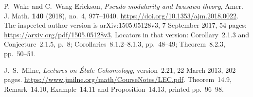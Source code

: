 P.~Wake and C.~Wang-Erickson,
\emph{Pseudo-modularity and Iwasawa theory},
Amer. J. Math. \textbf{140} (2018), no.~4, 977--1040.
\url{https://doi.org/10.1353/ajm.2018.0022}.
The inspected author version is arXiv:1505.05128v3,
7 September 2017, 54 pages:
\url{https://arxiv.org/pdf/1505.05128v3}.
Locators in that version: Corollary~2.1.3 and Conjecture~2.1.5, p.~8;
Corollaries~8.1.2--8.1.3, pp.~48--49;
Theorem~8.2.3, pp.~50--51.

J.~S.~Milne,
\emph{Lectures on \textup{\'Etale} Cohomology},
version~2.21, 22 March 2013, 202 pages.
\url{https://www.jmilne.org/math/CourseNotes/LEC.pdf}.
Theorem~14.9, Remark~14.10, Example~14.11 and Proposition~14.13,
printed pp.~96--98.
